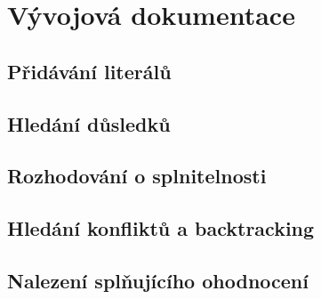 \chapter{Vývojová dokumentace}


\section{Přidávání literálů}\label{add}

\section{Hledání důsledků}\label{dusl}

\section{Rozhodování o splnitelnosti}

\section{Hledání konfliktů a backtracking}

\section{Nalezení splňujícího ohodnocení}
